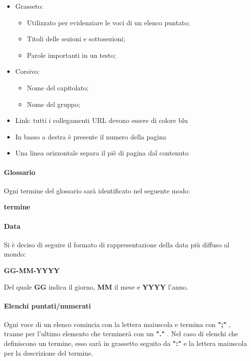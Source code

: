 \begin{itemize}
\item Grasseto:
\begin{itemize}
\item Utilizzato per evidenziare le voci di un elenco puntato;
\item Titoli delle sezioni e sottosezioni;
\item Parole importanti in un testo;
\end{itemize}
\item Corsivo:
\begin{itemize}
\item Nome del capitolato;
\item Nome del gruppo;
\end{itemize}
\item Link: tutti i collegamenti URL devono essere di colore blu
\item In basso a destra è presente il numero della pagina
\item Una linea orizzontale separa il piè di pagina dal contenuto

\end{itemize}

\paragraph{Glossario}
Ogni termine del glossario sarà identificato nel seguente modo:
\begin{center}
\textbf{termine}
\end{center}

\paragraph{Data}

Si è deciso di seguire il formato di rappresentazione della data più diffuso al mondo:\\
\begin{center}
\textbf{GG-MM-YYYY}
\end{center}
Del quale \textbf{GG} indica il giorno, \textbf{MM} il mese e \textbf{YYYY} l'anno.

\paragraph{Elenchi puntati/numerati}
Ogni voce di un elenco comincia con la lettera maiuscola e termina con \textbf{";"} , tranne per l'ultimo elemento che terminerà con un \textbf{"."} . 
Nel caso di elenchi che definiscono un termine, esso sarà in grassetto seguito da \textbf{":"} e la lettera maiuscola per la descrizione del termine.

